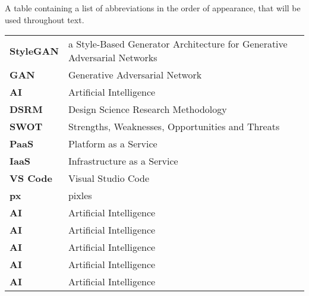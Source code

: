 \documentclass[a4paper,oneside,12pt]{book}
\begin{document}
\begin{TableOfAbbrev}
			A table containing a list of abbreviations in the order of appearance, that will be used throughout text.
			\begin{table}[!htpb!]%
			\begin{tabular}{ll}
			\textbf{StyleGAN} & a Style-Based Generator Architecture for Generative Adversarial Networks\\
			\textbf{GAN} & Generative Adversarial Network\\
			\textbf{AI} & Artificial Intelligence\\
			\textbf{DSRM} & Design Science Research Methodology\\
			\textbf{SWOT} & Strengths, Weaknesses, Opportunities and Threats\\
			\textbf{PaaS} & Platform as a Service\\
			\textbf{IaaS} & Infrastructure as a Service\\
			\textbf{VS Code} & Visual Studio Code\\
			\textbf{px} & pixles\\
			\textbf{AI} & Artificial Intelligence\\
			\textbf{AI} & Artificial Intelligence\\
			\textbf{AI} & Artificial Intelligence\\
			\textbf{AI} & Artificial Intelligence\\
			\textbf{AI} & Artificial Intelligence\\
			\end{tabular}
			\end{table}
\end{TableOfAbbrev}

\pagestyle{fancy}
\setcounter{page}{1}
\fancyhead{}
\renewcommand{\headrulewidth}{0pt}
\fancyfoot[c]{\thepage}









%
%
\end{document}
